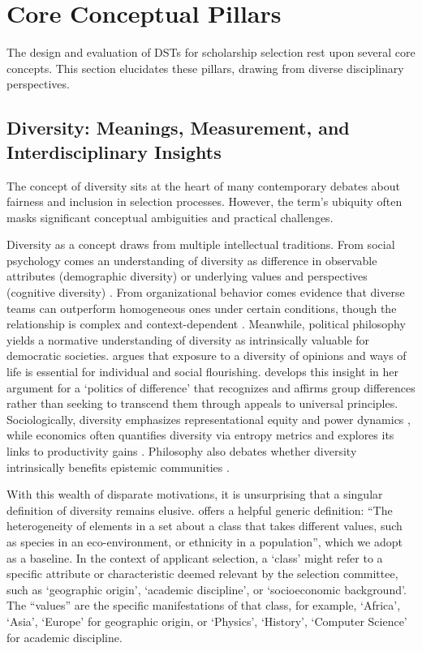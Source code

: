 \section{Core Conceptual Pillars}\label{sec:context_conceptual_pillars}

The design and evaluation of DSTs for scholarship selection rest upon several core concepts. This section elucidates these pillars, drawing from diverse disciplinary perspectives.

\subsection{Diversity: Meanings, Measurement, and Interdisciplinary Insights}\label{ssec:context_diversity}
The concept of diversity sits at the heart of many contemporary debates about fairness and inclusion in selection processes. However, the term's ubiquity often masks significant conceptual ambiguities and practical challenges.

Diversity as a concept draws from multiple intellectual traditions. From social psychology comes an understanding of diversity as difference in observable attributes (demographic diversity) or underlying values and perspectives (cognitive diversity) \cite{page_diversity_2010}. From organizational behavior comes evidence that diverse teams can outperform homogeneous ones under certain conditions, though the relationship is complex and context-dependent \cite{page_diversity_2017}. Meanwhile, political philosophy yields a normative understanding of diversity as intrinsically valuable for democratic societies. \textcite{mill1859liberty} argues that exposure to a diversity of opinions and ways of life is essential for individual and social flourishing. \textcite{young1990justice} develops this insight in her argument for a `politics of difference' that recognizes and affirms group differences rather than seeking to transcend them through appeals to universal principles. Sociologically, diversity emphasizes representational equity and power dynamics \cite{benjamin2019race,noble2018algorithms}, while economics often quantifies diversity via entropy metrics and explores its links to productivity gains \cite{noray2023systemic, page_diversity_2010}. Philosophy also debates whether diversity intrinsically benefits epistemic communities \cite{page_diversity_2010}.

With this wealth of disparate motivations, it is unsurprising that a singular definition of diversity remains elusive. \textcite{page_diversity_2010} offers a helpful generic definition: ``The heterogeneity of elements in a set about a class that takes different values, such as species in an eco-environment, or ethnicity in a population'', which we adopt as a baseline. In the context of applicant selection, a `class' might refer to a specific attribute or characteristic deemed relevant by the selection committee, such as `geographic origin', `academic discipline', or `socioeconomic background'. The ``values'' are the specific manifestations of that class, for example, `Africa', `Asia', `Europe' for geographic origin, or `Physics', `History', `Computer Science' for academic discipline.

